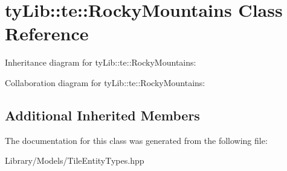 \hypertarget{classty_lib_1_1te_1_1_rocky_mountains}{}\section{ty\+Lib\+:\+:te\+:\+:Rocky\+Mountains Class Reference}
\label{classty_lib_1_1te_1_1_rocky_mountains}


Inheritance diagram for ty\+Lib\+:\+:te\+:\+:Rocky\+Mountains\+:


Collaboration diagram for ty\+Lib\+:\+:te\+:\+:Rocky\+Mountains\+:
\subsection*{Additional Inherited Members}


The documentation for this class was generated from the following file\+:\begin{DoxyCompactItemize}
\item 
Library/\+Models/Tile\+Entity\+Types.\+hpp\end{DoxyCompactItemize}
